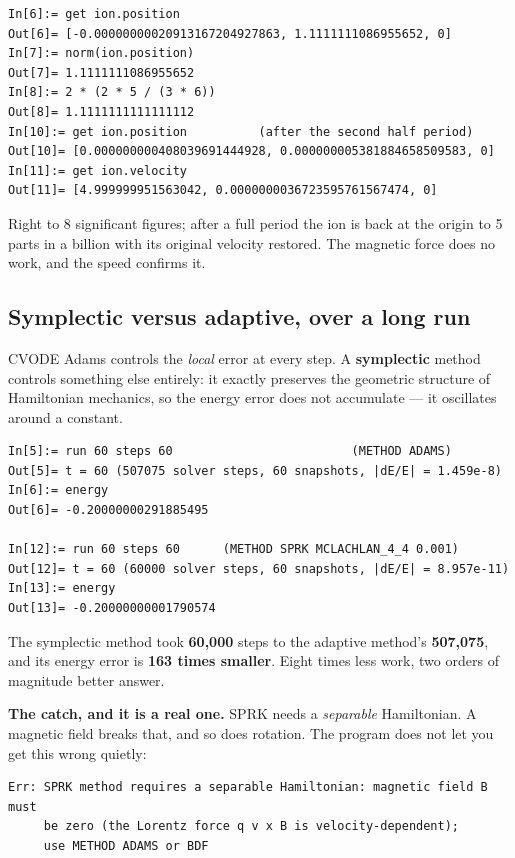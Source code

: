 \documentclass[11pt]{article}
\begin{document}
\begin{lstlisting}
In[6]:= get ion.position
Out[6]= [-0.00000000020913167204927863, 1.1111111086955652, 0]
In[7]:= norm(ion.position)
Out[7]= 1.1111111086955652
In[8]:= 2 * (2 * 5 / (3 * 6))
Out[8]= 1.1111111111111112
In[10]:= get ion.position          (after the second half period)
Out[10]= [0.000000000408039691444928, 0.000000005381884658509583, 0]
In[11]:= get ion.velocity
Out[11]= [4.999999951563042, 0.0000000036723595761567474, 0]
\end{lstlisting}

Right to 8 significant figures; after a full period the ion is back at
the origin to 5 parts in a billion with its original velocity restored.
The magnetic force does no work, and the speed confirms it.

\subsection{Symplectic versus adaptive, over a long run}

CVODE Adams controls the \emph{local} error at every step. A
\textbf{symplectic} method controls something else entirely: it exactly
preserves the geometric structure of Hamiltonian mechanics, so the
energy error does not accumulate --- it oscillates around a constant.

\begin{lstlisting}
In[5]:= run 60 steps 60                         (METHOD ADAMS)
Out[5]= t = 60 (507075 solver steps, 60 snapshots, |dE/E| = 1.459e-8)
In[6]:= energy
Out[6]= -0.20000000291885495

In[12]:= run 60 steps 60      (METHOD SPRK MCLACHLAN_4_4 0.001)
Out[12]= t = 60 (60000 solver steps, 60 snapshots, |dE/E| = 8.957e-11)
In[13]:= energy
Out[13]= -0.20000000001790574
\end{lstlisting}

The symplectic method took \textbf{60{,}000} steps to the adaptive
method's \textbf{507{,}075}, and its energy error is \textbf{163 times
smaller}. Eight times less work, two orders of magnitude better answer.

\textbf{The catch, and it is a real one.} SPRK needs a \emph{separable}
Hamiltonian. A magnetic field breaks that, and so does rotation. The
program does not let you get this wrong quietly:

\begin{lstlisting}
Err: SPRK method requires a separable Hamiltonian: magnetic field B must
     be zero (the Lorentz force q v x B is velocity-dependent);
     use METHOD ADAMS or BDF
\end{lstlisting}
\end{document}
